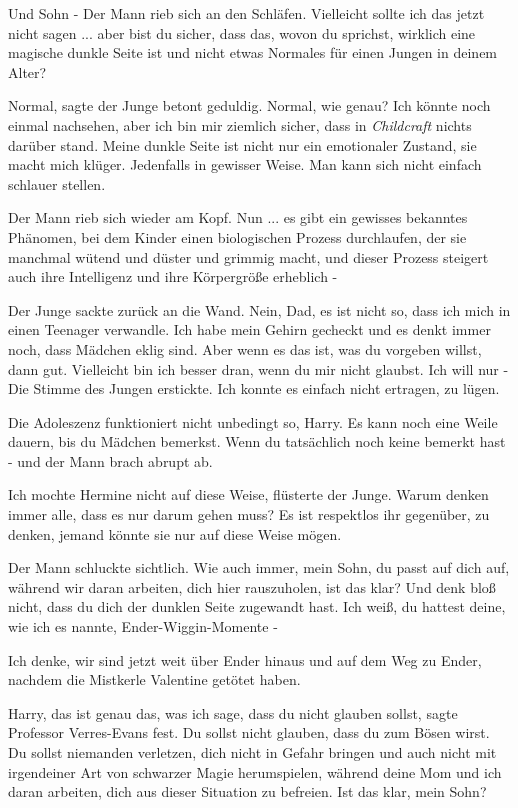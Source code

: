\glqq{}Und Sohn -\grqq{} Der Mann rieb sich an den Schläfen. \glqq{}Vielleicht
sollte ich das jetzt nicht sagen ... aber bist du sicher, dass das, wovon du
sprichst, wirklich eine magische dunkle Seite ist und nicht etwas Normales für
einen Jungen in deinem Alter?\grqq{}

\glqq{}Normal\grqq{}, sagte der Junge betont geduldig. \glqq{}Normal, wie genau?
Ich könnte noch einmal nachsehen, aber ich bin mir ziemlich sicher, dass in
\emph{Childcraft} nichts darüber stand. Meine dunkle Seite ist nicht nur ein
emotionaler Zustand, sie macht mich klüger. Jedenfalls in gewisser Weise. Man
kann sich nicht einfach schlauer stellen.\grqq{}

Der Mann rieb sich wieder am Kopf. \glqq{}Nun ... es gibt ein gewisses bekanntes
Phänomen, bei dem Kinder einen biologischen Prozess durchlaufen, der sie
manchmal wütend und düster und grimmig macht, und dieser Prozess steigert auch
ihre Intelligenz und ihre Körpergröße erheblich -\grqq{}

Der Junge sackte zurück an die Wand. \glqq{}Nein, Dad, es ist nicht so, dass ich
mich in einen Teenager verwandle. Ich habe mein Gehirn gecheckt und es denkt
immer noch, dass Mädchen eklig sind. Aber wenn es das ist, was du vorgeben
willst, dann gut. Vielleicht bin ich besser dran, wenn du mir nicht glaubst. Ich
will nur -\grqq{} Die Stimme des Jungen erstickte. \glqq{}Ich konnte es einfach
nicht ertragen, zu lügen.\grqq{}

\glqq{}Die Adoleszenz funktioniert nicht unbedingt so, Harry. Es kann noch eine
Weile dauern, bis du Mädchen bemerkst. Wenn du tatsächlich noch keine bemerkt
hast -\grqq{} und der Mann brach abrupt ab.

\glqq{}Ich mochte Hermine nicht auf diese Weise\grqq{}, flüsterte der Junge.
\glqq{}Warum denken immer alle, dass es nur darum gehen muss? Es ist respektlos
ihr gegenüber, zu denken, jemand könnte sie nur auf diese Weise mögen.\grqq{}

Der Mann schluckte sichtlich. \glqq{}Wie auch immer, mein Sohn, du passt auf dich
auf, während wir daran arbeiten, dich hier rauszuholen, ist das klar? Und denk
bloß nicht, dass du dich der dunklen Seite zugewandt hast. Ich weiß, du hattest
deine, wie ich es nannte, Ender-Wiggin-Momente -\grqq{}

\glqq{}Ich denke, wir sind jetzt weit über Ender hinaus und auf dem Weg zu Ender,
nachdem die Mistkerle Valentine getötet haben.\grqq{}

\glqq{}Harry, das ist genau das, was ich sage, dass du nicht glauben
sollst\grqq{}, sagte Professor Verres-Evans fest. \glqq{}Du sollst nicht glauben,
dass du zum Bösen wirst. Du sollst niemanden verletzen, dich nicht in Gefahr
bringen und auch nicht mit irgendeiner Art von schwarzer Magie herumspielen,
während deine Mom und ich daran arbeiten, dich aus dieser Situation zu befreien.
Ist das klar, mein Sohn?\grqq{}

